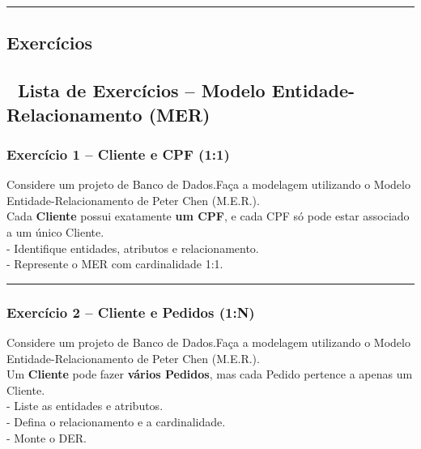 \documentclass[
]{book}
\begin{document}
\begin{center}\rule{0.5\linewidth}{0.5pt}\end{center}

\subsection{Exercícios}\label{exercuxedcios-1}

\subsection{📝 Lista de Exercícios -- Modelo Entidade-Relacionamento (MER)}\label{lista-de-exercuxedcios-modelo-entidade-relacionamento-mer}

\subsubsection{Exercício 1 -- Cliente e CPF (1:1)}\label{exercuxedcio-1-cliente-e-cpf-11}

Considere um projeto de Banco de Dados.Faça a modelagem utilizando o Modelo Entidade-Relacionamento de Peter Chen (M.E.R.).\\
Cada \textbf{Cliente} possui exatamente \textbf{um CPF}, e cada CPF só pode estar associado a um único Cliente.\\
- Identifique entidades, atributos e relacionamento.\\
- Represente o MER com cardinalidade 1:1.



\begin{center}\rule{0.5\linewidth}{0.5pt}\end{center}

\subsubsection{Exercício 2 -- Cliente e Pedidos (1:N)}\label{exercuxedcio-2-cliente-e-pedidos-1n}

Considere um projeto de Banco de Dados.Faça a modelagem utilizando o Modelo Entidade-Relacionamento de Peter Chen (M.E.R.).\\
Um \textbf{Cliente} pode fazer \textbf{vários Pedidos}, mas cada Pedido pertence a apenas um Cliente.\\
- Liste as entidades e atributos.\\
- Defina o relacionamento e a cardinalidade.\\
- Monte o DER.
\end{document}
